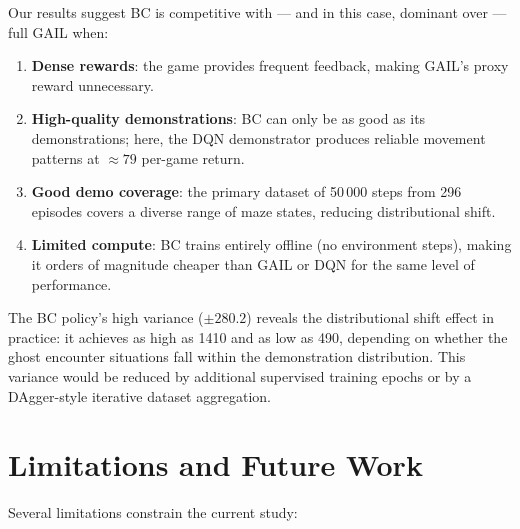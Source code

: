 \documentclass[conference]{IEEEtran}
\begin{document}
Our results suggest BC is competitive with — and in this case, dominant over — full GAIL
when:
\begin{enumerate}
  \item \textbf{Dense rewards}: the game provides frequent feedback, making GAIL's proxy
        reward unnecessary.
  \item \textbf{High-quality demonstrations}: BC can only be as good as its demonstrations;
        here, the DQN demonstrator produces reliable movement patterns at $\approx79$
        per-game return.
  \item \textbf{Good demo coverage}: the primary dataset of 50\,000 steps from 296 episodes
        covers a diverse range of maze states, reducing distributional shift.
  \item \textbf{Limited compute}: BC trains entirely offline (no environment steps),
        making it orders of magnitude cheaper than GAIL or DQN for the same level of
        performance.
\end{enumerate}

The BC policy's high variance ($\pm280.2$) reveals the distributional shift effect in
practice: it achieves as high as 1410 and as low as 490, depending on whether the ghost
encounter situations fall within the demonstration distribution.
This variance would be reduced by additional supervised training epochs or by a DAgger-style
iterative dataset aggregation.

\section{Limitations and Future Work}
\label{sec:limitations}

Several limitations constrain the current study:
\end{document}
